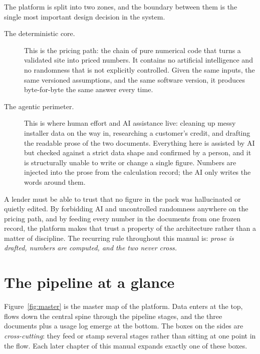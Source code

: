 The platform is split into two zones, and the boundary between them is the single most important design decision in the system.

\begin{description}
  \item[The deterministic core.] This is the pricing path: the chain of pure numerical code that turns a validated site into priced numbers. It contains no artificial intelligence and no randomness that is not explicitly controlled. Given the same inputs, the same versioned assumptions, and the same software version, it produces byte-for-byte the same answer every time.
  \item[The agentic perimeter.] This is where human effort and AI assistance live: cleaning up messy installer data on the way in, researching a customer's credit, and drafting the readable prose of the two documents. Everything here is assisted by AI but checked against a strict data shape and confirmed by a person, and it is structurally unable to write or change a single figure. Numbers are injected into the prose from the calculation record; the AI only writes the words around them.
\end{description}

\begin{keyidea}
A lender must be able to trust that no figure in the pack was hallucinated or quietly edited. By forbidding AI and uncontrolled randomness anywhere on the pricing path, and by feeding every number in the documents from one frozen record, the platform makes that trust a property of the architecture rather than a matter of discipline. The recurring rule throughout this manual is: \emph{prose is drafted, numbers are computed, and the two never cross.}
\end{keyidea}

\section{The pipeline at a glance}

Figure~\ref{fig:master} is the master map of the platform. Data enters at the top, flows down the central spine through the pipeline stages, and the three documents plus a usage log emerge at the bottom. The boxes on the sides are \emph{cross-cutting}: they feed or stamp several stages rather than sitting at one point in the flow. Each later chapter of this manual expands exactly one of these boxes.

